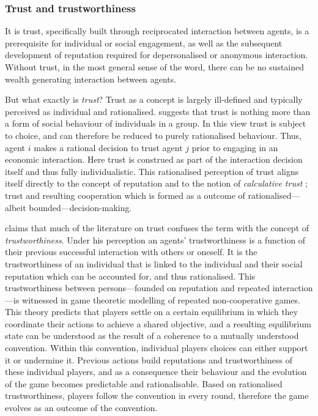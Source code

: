 \begin{subappendices}
\subsubsection{Trust and trustworthiness}

It is trust, specifically built through reciprocated interaction between agents, is a prerequisite for individual or social engagement, as well as the subsequent development of reputation required for depersonalised or anonymous interaction. Without trust, in the most general sense of the word, there can be no sustained wealth generating interaction between agents. 

But what exactly is \emph{trust}? Trust as a concept is largely ill-defined and typically perceived as individual and rationalised. \citet{Coleman1990} suggests that trust is nothing more than a form of social behaviour of individuals in a group. In this view trust is subject to choice, and can therefore be reduced to purely rationalised behaviour. Thus, agent $i$ makes a rational decision to trust agent $j$ prior to engaging in an economic interaction. Here trust is construed as part of the interaction decision itself and thus fully individualistic. This rationalised perception of trust aligns itself directly to the concept of reputation and to the notion of \textit{calculative trust} \citep{Williamson1993}; trust and resulting cooperation which is formed as a outcome of rationalised---albeit bounded---decision-making.

\citet{Hardin2006} claims that much of the literature on trust confuses the term with the concept of \textit{trustworthiness}. Under his perception an agents' trustworthiness is a function of their previous successful interaction with others or oneself. It is the trustworthiness of an individual that is linked to the individual and their social reputation which can be accounted for, and thus rationalised. This trustworthiness between persons---founded on reputation and repeated interaction---is witnessed in game theoretic modelling of repeated non-cooperative games. This theory predicts that players settle on a certain equilibrium in which they coordinate their actions to achieve a shared objective, and a resulting equilibrium state can be understood as the result of a coherence to a mutually understood convention. Within this convention, individual players choices can either support it or undermine it. Previous actions build reputations and trustworthiness of these individual players, and as a consequence their behaviour and the evolution of the game becomes predictable and rationalisable. Based on rationalised trustworthiness, players follow the convention in every round, therefore the game evolves as an outcome of the convention.


\end{subappendices}
